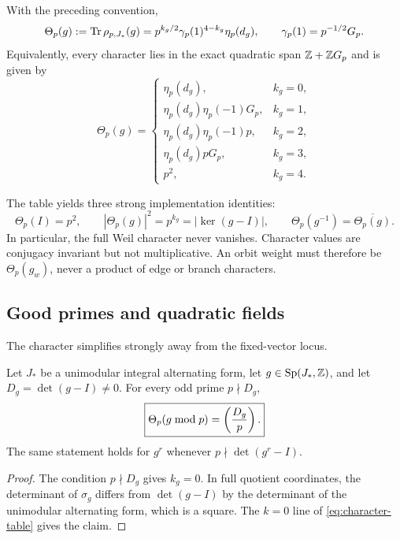 \begin{theorem}
\label{thm:thomas}
With the preceding convention,
\[
\Theta_p(g):=\operatorname{Tr}\rho_{p,J_*}(g)
=p^{k_g/2}\gamma_p(1)^{4-k_g}\eta_p(d_g),
\qquad
\gamma_p(1)=p^{-1/2}G_p.
\]
Equivalently, every character lies in the exact quadratic span
\(\mathbb{Z}+\mathbb{Z} G_p\) and is given by
\begin{equation}
\Theta_p(g)=
\begin{cases}
\eta_p(d_g),&k_g=0,\\
\eta_p(d_g)\eta_p(-1)G_p,&k_g=1,\\
\eta_p(d_g)\eta_p(-1)p,&k_g=2,\\
\eta_p(d_g)pG_p,&k_g=3,\\
p^2,&k_g=4.
\end{cases}
\label{eq:character-table}
\end{equation}
\end{theorem}

The table yields three strong implementation identities:
\begin{equation}
\Theta_p(I)=p^2,
\qquad
|\Theta_p(g)|^2=p^{k_g}=|\ker(g-I)|,
\qquad
\Theta_p(g^{-1})=\overline{\Theta_p(g)}.
\label{eq:character-checks}
\end{equation}
In particular, the full Weil character never vanishes.  Character values are
conjugacy invariant but not multiplicative.  An orbit weight must therefore
be \(\Theta_p(g_w)\), never a product of edge or branch characters.

\subsection{Good primes and quadratic fields}

The character simplifies strongly away from the fixed-vector locus.

\begin{proposition}
\label{prop:goodprime}
Let \(J_*\) be a unimodular integral alternating form, let
\(g\in\operatorname{Sp}(J_*,\mathbb{Z})\), and let
\(D_g=\det(g-I)\ne0\).  For every odd prime \(p\nmid D_g\),
\[
\boxed{\Theta_p(g\bmod p)=\left(\frac{D_g}{p}\right).}
\]
The same statement holds for \(g^r\) whenever
\(p\nmid\det(g^r-I)\).
\end{proposition}

\begin{proof}
The condition \(p\nmid D_g\) gives \(k_g=0\).  In full quotient coordinates,
the determinant of \(\sigma_g\) differs from \(\det(g-I)\) by the determinant
of the unimodular alternating form, which is a square.  The \(k=0\) line of
\cref{eq:character-table} gives the claim.
\end{proof}

